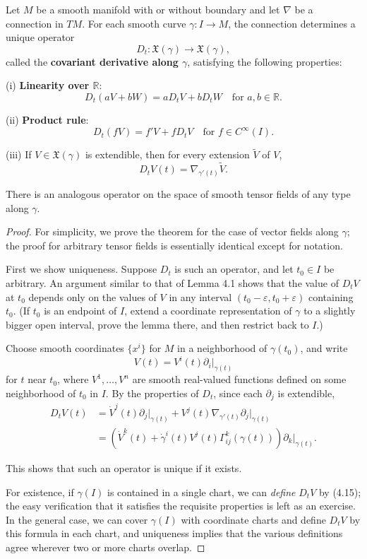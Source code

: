 \begin{theorem}
\label{thm:covariant-derivative-along-curve}
Let $M$ be a smooth manifold with or without boundary and let $\nabla$ be a connection in $TM$. For each smooth curve $\gamma : I \to M$, the connection determines a unique operator
\[
D_t : \mathfrak{X}(\gamma) \to \mathfrak{X}(\gamma),
\]
called the \textbf{covariant derivative along $\gamma$}, satisfying the following properties:

(i) \textbf{Linearity over $\mathbb{R}$}:
\[
D_t(aV + bW) = aD_tV + bD_tW \quad \text{for } a, b \in \mathbb{R}.
\]

(ii) \textbf{Product rule}:
\[
D_t(fV) = f'V + fD_tV \quad \text{for } f \in C^{\infty}(I).
\]

(iii) If $V \in \mathfrak{X}(\gamma)$ is extendible, then for every extension $\tilde{V}$ of $V$,
\[
D_tV(t) = \nabla_{\gamma'(t)}\tilde{V}.
\]

There is an analogous operator on the space of smooth tensor fields of any type along $\gamma$.
\end{theorem}

\begin{proof}
For simplicity, we prove the theorem for the case of vector fields along $\gamma$; the proof for arbitrary tensor fields is essentially identical except for notation.

First we show uniqueness. Suppose $D_t$ is such an operator, and let $t_0 \in I$ be arbitrary. An argument similar to that of Lemma 4.1 shows that the value of $D_t V$ at $t_0$ depends only on the values of $V$ in any interval $(t_0 - \varepsilon, t_0 + \varepsilon)$ containing $t_0$. (If $t_0$ is an endpoint of $I$, extend a coordinate representation of $\gamma$ to a slightly bigger open interval, prove the lemma there, and then restrict back to $I$.)

Choose smooth coordinates $\{x^i\}$ for $M$ in a neighborhood of $\gamma(t_0)$, and write
\[
V(t) = V^i(t)\partial_i\bigg|_{\gamma(t)}
\]
for $t$ near $t_0$, where $V^1, \ldots, V^n$ are smooth real-valued functions defined on some neighborhood of $t_0$ in $I$. By the properties of $D_t$, since each $\partial_j$ is extendible,
\begin{align}
D_tV(t) &= \dot{V}^j(t)\partial_j\bigg|_{\gamma(t)} + V^j(t)\nabla_{\gamma'(t)}\partial_j\bigg|_{\gamma(t)} \nonumber \\
&= \left(\dot{V}^k(t) + \dot{\gamma}^i(t)V^j(t)\Gamma_{ij}^k(\gamma(t))\right)\partial_k\bigg|_{\gamma(t)}. \tag{4.15}
\end{align}

This shows that such an operator is unique if it exists.

For existence, if $\gamma(I)$ is contained in a single chart, we can \emph{define} $D_t V$ by (4.15); the easy verification that it satisfies the requisite properties is left as an exercise. In the general case, we can cover $\gamma(I)$ with coordinate charts and define $D_t V$ by this formula in each chart, and uniqueness implies that the various definitions agree wherever two or more charts overlap.
\end{proof}

